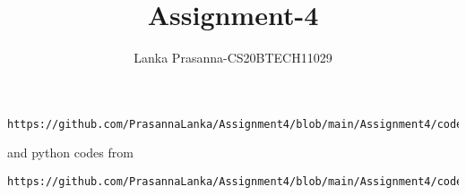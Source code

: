 \documentclass[journal,12pt,twocolumn]{IEEEtran}
\DeclareMathOperator*{\Res}{Res}
\begin{document}
\newcommand{\BEQA}{\begin{eqnarray}}
\newcommand{\EEQA}{\end{eqnarray}}
\newcommand{\define}{\stackrel{\triangle}{=}}

\raggedbottom
\setlength{\parindent}{0pt}
\providecommand{\mbf}{\mathbf}
\providecommand{\pr}[1]{\ensuremath{\Pr\left(#1\right)}}
\providecommand{\qfunc}[1]{\ensuremath{Q\left(#1\right)}}
\providecommand{\sbrak}[1]{\ensuremath{{}\left[#1\right]}}
\providecommand{\lsbrak}[1]{\ensuremath{{}\left[#1\right.}}
\providecommand{\rsbrak}[1]{\ensuremath{{}\left.#1\right]}}
\providecommand{\brak}[1]{\ensuremath{\left(#1\right)}}
\providecommand{\lbrak}[1]{\ensuremath{\left(#1\right.}}
\providecommand{\rbrak}[1]{\ensuremath{\left.#1\right)}}
\providecommand{\cbrak}[1]{\ensuremath{\left\{#1\right\}}}
\providecommand{\lcbrak}[1]{\ensuremath{\left\{#1\right.}}
\providecommand{\rcbrak}[1]{\ensuremath{\left.#1\right\}}}
\theoremstyle{remark}
\newtheorem{rem}{Remark}
\newcommand{\sgn}{\mathop{\mathrm{sgn}}}
\providecommand{\abs}[1]{\vert#1\vert}
\providecommand{\res}[1]{\Res\displaylimits_{#1}} 
\providecommand{\norm}[1]{\lVert#1\rVert}
\providecommand{\mtx}[1]{\mathbf{#1}}
\providecommand{\mean}[1]{E[ #1 ]}
\providecommand{\fourier}{\overset{\mathcal{F}}{ \rightleftharpoons}}
\providecommand{\system}{\overset{\mathcal{H}}{ \longleftrightarrow}}
\newcommand{\solution}{\noindent \textbf{Solution: }}
\newcommand{\cosec}{\,\text{cosec}\,}
\providecommand{\dec}[2]{\ensuremath{\overset{#1}{\underset{#2}{\gtrless}}}}
\newcommand{\myvec}[1]{\ensuremath{\begin{pmatrix}#1\end{pmatrix}}}
\newcommand{\mydet}[1]{\ensuremath{\begin{vmatrix}#1\end{vmatrix}}}
\makeatletter
{}
\makeatother
\let\StandardTheFigure\thefigure
\let\vec\mathbf
\renewcommand{\thefigure}{\theproblem}
\def\putbox#1#2#3{\makebox[0in][l]{\makebox[#1][l]{}\raisebox{\baselineskip}[0in][0in]{\raisebox{#2}[0in][0in]{#3}}}}
     \def\rightbox#1{\makebox[0in][r]{#1}}
     \def\centbox#1{\makebox[0in]{#1}}
     \def\topbox#1{\raisebox{-\baselineskip}[0in][0in]{#1}}
     \def\midbox#1{\raisebox{-0.5\baselineskip}[0in][0in]{#1}}
\vspace{3cm}
\title{Assignment-4}
\author{Lanka Prasanna-CS20BTECH11029}
\maketitle
\newpage
\bigskip
\renewcommand{\thefigure}{\theenumi}
\renewcommand{\thetable}{\theenumi}
\begin{lstlisting}
https://github.com/PrasannaLanka/Assignment4/blob/main/Assignment4/codes/Assignment4.tex
\end{lstlisting}
and python codes from
\begin{lstlisting}
https://github.com/PrasannaLanka/Assignment4/blob/main/Assignment4/codes/Assignment4.py
\end{lstlisting}
\end{document}

